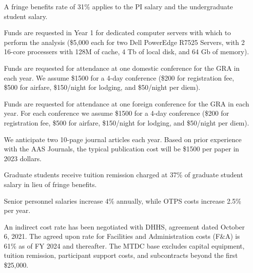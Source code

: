 \documentclass[12pt, preprint]{hacked-aastex}
\begin{document}
 A fringe benefits rate 
of 31\% applies to the PI salary and the undergraduate student salary.

 Funds are requested in Year 1 for 
dedicated computer  servers with which to perform the analysis (\$5,000 each
for two Dell PowerEdge R7525 Servers, with 2 16-core processers with 128M 
of cache, 4 Tb of local disk,  and 64 Gb of memory).

 Funds are requested for attendance at
one domestic conference for the GRA in each year. We assume \$1500 for
a 4-day conference (\$200 for registration fee, \$500 for airfare,
\$150/night for lodging, and \$50/night per diem).

 Funds are requested for attendance at
one foreign conference for the GRA in each year. For each conference
we assume \$1500 for a 4-day conference (\$200 for registration fee,
\$500 for airfare, \$150/night for lodging, and \$50/night per diem).

 We anticipate two 10-page journal
articles each year. Based on prior experience with the AAS Journals,
the typical publication cost will be \$1500 per paper in 2023 dollars.

 Graduate students receive tuition
remission charged at 37\% of graduate student salary in lieu of fringe
benefits.

 Senior personnel salaries increase 4\%
annually, while OTPS costs increase 2.5\% per year.

 An indirect cost rate has been
negotiated with DHHS, agreement dated October 6, 2021.  The agreed
upon rate for Facilities and Administration costs (F\&A) is 61\% as of
FY 2024 and thereafter.  The MTDC base excludes capital equipment,
tuition remission, participant support costs, and subcontracts beyond
the first \$25,000.
\end{document}
